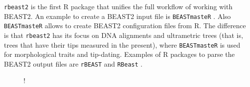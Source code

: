 \documentclass{article}
\begin{document}
\verb;rbeast2; is the first R package that unifies the
full workflow of working with BEAST2. An
example to create a BEAST2 input file is 
\verb;BEASTmasteR; \cite{beastmaster}.
Also \verb;BEASTmasteR; allows 
to create BEAST2 configuration files from R. 
The difference is that \verb;rbeast2; 
has its focus on DNA alignments and ultrametric trees (that
is, trees that have their tips measured in the present), 
where \verb;BEASTmasteR; is used for 
morphological traits and tip-dating.
Examples of R packages to parse the BEAST2 output files
are \verb;rBEAST; \cite{rBEAST_ratmann} and 
\verb;RBeast; \cite{RBeast_faria}. 

\begin{figure}
  \centering
   {!} {
    }
\end{figure}
\end{document}
